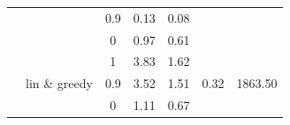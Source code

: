 \begin{table}[]
\begin{tabular}{ccccccc}
\multicolumn{1}{|c|}{}                         & \multicolumn{1}{c|}{}                               & \multicolumn{1}{c|}{0.9}                & \multicolumn{1}{c|}{0.13}                & \multicolumn{1}{c|}{0.08}                & \multicolumn{1}{c|}{}                                                                    & \multicolumn{1}{c|}{}                                                                          \\ \cline{3-5}
\multicolumn{1}{|c|}{}                         & \multicolumn{1}{c|}{}                               & \multicolumn{1}{c|}{0}                  & \multicolumn{1}{c|}{0.97}                & \multicolumn{1}{c|}{0.61}                & \multicolumn{1}{c|}{}                                                                    & \multicolumn{1}{c|}{}                                                                          \\ \cline{2-7} 
\multicolumn{1}{|c|}{}                         & \multicolumn{1}{c|}{\multirow{3}{*}{lin \& greedy}} & \multicolumn{1}{c|}{1}                  & \multicolumn{1}{c|}{3.83}                & \multicolumn{1}{c|}{1.62}                & \multicolumn{1}{c|}{\multirow{3}{*}{0.32}}                                               & \multicolumn{1}{c|}{\multirow{3}{*}{1863.50}}                                                  \\ \cline{3-5}
\multicolumn{1}{|c|}{}                         & \multicolumn{1}{c|}{}                               & \multicolumn{1}{c|}{0.9}                & \multicolumn{1}{c|}{3.52}                & \multicolumn{1}{c|}{1.51}                & \multicolumn{1}{c|}{}                                                                    & \multicolumn{1}{c|}{}                                                                          \\ \cline{3-5}
\multicolumn{1}{|c|}{}                         & \multicolumn{1}{c|}{}                               & \multicolumn{1}{c|}{0}                  & \multicolumn{1}{c|}{1.11}                & \multicolumn{1}{c|}{0.67}                & \multicolumn{1}{c|}{}                                                                    & \multicolumn{1}{c|}{}                                                                          \\ \hline
\end{tabular}
\end{table}






